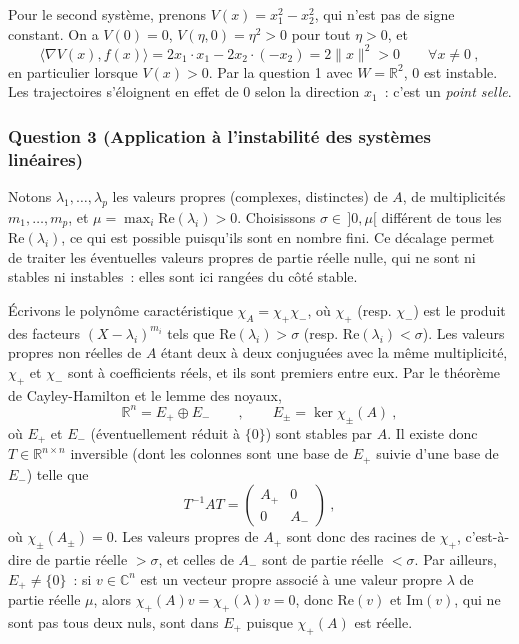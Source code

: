 Pour le second système, prenons \(V(x)=x_1^2-x_2^2\), qui n'est pas de
signe constant. On a \(V(0)=0\), \(V(\eta,0)=\eta^2>0\) pour tout
\(\eta>0\), et \[
\langle\nabla V (x), f(x)\rangle = 2x_1\cdot x_1 - 2x_2\cdot(-x_2) = 2\|x\|^2 >0 \qquad \forall x\neq 0 \ ,
\] en particulier lorsque \(V(x)>0\). Par la question 1 avec
\(W=\mathbb{R}^2\), \(0\) est instable. Les trajectoires s'éloignent en
effet de \(0\) selon la direction \(x_1\)~: c'est un \emph{point selle}.

\hypertarget{answer-instab-3}{%
\subsubsection*{Question 3 (Application à l'instabilité des systèmes
linéaires)}\label{answer-instab-3}}


Notons \(\lambda_1,\ldots,\lambda_p\) les valeurs propres (complexes,
distinctes) de \(A\), de multiplicités \(m_1,\ldots,m_p\), et
\(\mu = \max_i \mathrm{Re}(\lambda_i)>0\). Choisissons
\(\sigma\in \, ]0,\mu[\) différent de tous les \(\mathrm{Re}(\lambda_i)\),
ce qui est possible puisqu'ils sont en nombre fini. Ce décalage permet
de traiter les éventuelles valeurs propres de partie réelle nulle, qui
ne sont ni \og stables\fg{} ni \og instables\fg{}~: elles sont ici rangées
du côté stable.

Écrivons le polynôme caractéristique \(\chi_A=\chi_+\chi_-\), où
\(\chi_+\) (resp. \(\chi_-\)) est le produit des facteurs
\((X-\lambda_i)^{m_i}\) tels que \(\mathrm{Re}(\lambda_i)>\sigma\) (resp.
\(\mathrm{Re}(\lambda_i)<\sigma\)). Les valeurs propres non réelles de
\(A\) étant deux à deux conjuguées avec la même multiplicité, \(\chi_+\)
et \(\chi_-\) sont à coefficients réels, et ils sont premiers entre eux.
Par le théorème de Cayley-Hamilton et le lemme des noyaux, \[
\mathbb{R}^n = E_+ \oplus E_- \qquad , \qquad E_\pm = \ker \chi_\pm(A) \ ,
\] où \(E_+\) et \(E_-\) (éventuellement réduit à \(\{0\}\)) sont stables
par \(A\). Il existe donc \(T\in \mathbb{R}^{n\times n}\) inversible
(dont les colonnes sont une base de \(E_+\) suivie d'une base de
\(E_-\)) telle que \[
T^{-1}AT = \left( \begin{matrix} A_+ & 0\\ 0 & A_- \end{matrix}\right) \ ,
\] où \(\chi_\pm(A_\pm)=0\). Les valeurs propres de \(A_+\) sont donc des
racines de \(\chi_+\), c'est-à-dire de partie réelle \(>\sigma\), et
celles de \(A_-\) sont de partie réelle \(<\sigma\). Par ailleurs,
\(E_+\neq\{0\}\)~: si \(v\in\mathbb{C}^n\) est un vecteur propre associé
à une valeur propre \(\lambda\) de partie réelle \(\mu\), alors
\(\chi_+(A)v = \chi_+(\lambda)v = 0\), donc \(\mathrm{Re}(v)\) et
\(\mathrm{Im}(v)\), qui ne sont pas tous deux nuls, sont dans \(E_+\)
puisque \(\chi_+(A)\) est réelle.

